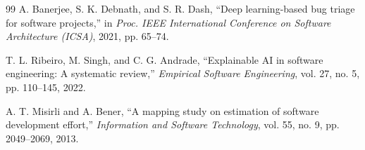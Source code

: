 \documentclass[journal]{IEEEtran}
\begin{document}
\begin{thebibliography}{99}
A. Banerjee, S. K. Debnath, and S. R. Dash, ``Deep learning-based bug triage for software projects,'' in \emph{Proc. IEEE International Conference on Software Architecture (ICSA)}, 2021, pp. 65--74.

T. L. Ribeiro, M. Singh, and C. G. Andrade, ``Explainable AI in software engineering: A systematic review,'' \emph{Empirical Software Engineering}, vol. 27, no. 5, pp. 110--145, 2022.

A. T. Misirli and A. Bener, ``A mapping study on estimation of software development effort,'' \emph{Information and Software Technology}, vol. 55, no. 9, pp. 2049--2069, 2013.

\end{thebibliography}
\end{document}
